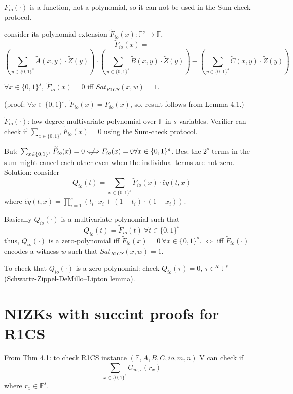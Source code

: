 \documentclass{article}
\theoremstyle{definition}
\newenvironment{lemma}[1]
{\renewcommand\theinnerlemma{#1}\innerlemma}
{\endinnerlemma}
\begin{document}
$F_{io}(\cdot)$ is a function, not a polynomial, so it can not be used in the Sum-check protocol.

consider its polynomial extension $\widetilde{F}_{io}(x): \mathbb{F}^s \rightarrow \mathbb{F}$,
$$\widetilde{F}_{io}(x)=$$
$$
\left( \sum_{y \in \{0,1\}^s} \widetilde{A}(x, y) \cdot \widetilde{Z}(y) \right) \cdot \left( \sum_{y \in \{0,1\}^s} \widetilde{B}(x, y) \cdot \widetilde{Z}(y) \right) - \left( \sum_{y \in \{0,1\}^s} \widetilde{C}(x, y) \cdot \widetilde{Z}(y) \right)
$$

\begin{lemma}{4.2}
	$\forall x \in \{0,1\}^s,~ \widetilde{F}_{io}(x)=0$ iff $Sat_{R1CS}(x, w)=1$.
\end{lemma}

(proof: $\forall x \in \{0,1\}^s,~ \widetilde{F}_{io}(x)=F_{io}(x)$, so, result follows from Lemma 4.1.) %

\vspace{0.5cm}

$\widetilde{F}_{io}(\cdot)$: low-degree multivariate polynomial over $\mathbb{F}$ in $s$ variables.
Verifier can check if $\sum_{x \in \{0,1\}^s} \widetilde{F}_{io}(x)=0$ using the Sum-check protocol.

But: $\sum_{x\in \{0,1\}^s} \widetilde{F}_{io}(x)=0 \centernot\Longleftrightarrow F_{io}(x)=0 \forall x \in \{0,1\}^s$.
Bcs: the $2^s$ terms in the sum might cancel each other even when the individual terms are not zero.
Solution: consider
$$Q_{io}(t)= \sum_{x \in \{0,1\}^s} \widetilde{F}_{io}(x) \cdot \widetilde{eq}(t, x)$$
where $\widetilde{eq}(t, x) = \prod_{i=1}^s (t_i \cdot x_i + (1- t_i) \cdot (1- x_i))$.

Basically $Q_{io}(\cdot)$ is a multivariate polynomial such that
$$Q_{io}(t) = \widetilde{F}_{io}(t) ~\forall t \in \{0,1\}^s$$
thus, $Q_{io}(\cdot)$ is a zero-polynomial iff $\widetilde{F}_{io}(x)=0 ~\forall x\in \{0,1\}^s$.
$\Longleftrightarrow$ iff $\widetilde{F}_{io}(\cdot)$ encodes a witness $w$ such that $Sat_{R1CS}(x, w)=1$.

To check that $Q_{io}(\cdot)$ is a zero-polynomial: check $Q_{io}(\tau)=0,~ \tau \in^R \mathbb{F}^s$ (Schwartz-Zippel-DeMillo–Lipton lemma).

\section{NIZKs with succint proofs for R1CS}

From Thm 4.1: to check R1CS instance $(\mathbb{F}, A, B, C, io, m, n)$ V can check if
$$\sum_{x \in \{0,1\}^s} G_{io, \tau} (r_x)$$
where $r_x \in \mathbb{F}^s$.
\end{document}
